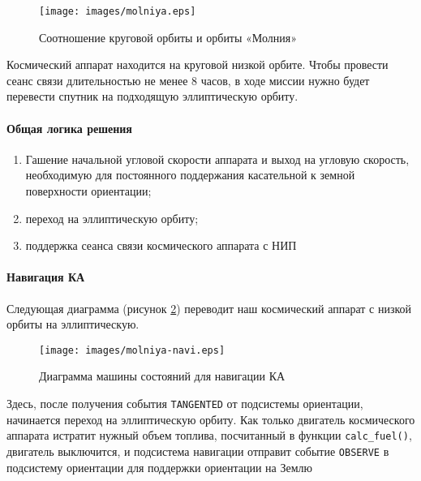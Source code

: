 \documentclass[12pt,a4paper]{article}
\begin{document}
\begin{figure}[tbh]
  \begin{center}
    \texttt{[image: images/molniya.eps]}
    \caption{Соотношение круговой орбиты и орбиты «Молния»}
    \label{Pic:Molniya}
  \end{center}
\end{figure}

Космический аппарат находится на круговой низкой орбите. Чтобы провести сеанс связи длительностью не менее 8 часов, в ходе миссии нужно будет перевести спутник на подходящую эллиптическую
орбиту.

\clearpage
\paragraph{Общая логика решения} 

\begin{enumerate}
\item Гашение начальной угловой скорости аппарата и выход на угловую скорость, необходимую для постоянного поддержания касательной к земной поверхности ориентации;
\item переход на эллиптическую орбиту;
\item поддержка сеанса связи космического аппарата с НИП
\end{enumerate}

\paragraph{Навигация КА} Следующая диаграмма (рисунок \ref{Pic:Molniya-navi}) переводит наш космический аппарат с низкой орбиты на эллиптическую.

\begin{figure}[tbh]
  \begin{center}
    \texttt{[image: images/molniya-navi.eps]}
    \caption{Диаграмма машины состояний для навигации КА}
    \label{Pic:Molniya-navi}
  \end{center}
\end{figure}

Здесь, после получения события \verb'TANGENTED' от подсистемы ориентации, начинается переход на эллиптическую орбиту. Как только двигатель космического аппарата истратит нужный объем топлива, посчитанный в функции \verb'calc_fuel()', двигатель выключится, и подсистема навигации отправит событие \verb'OBSERVE' в подсистему ориентации для поддержки ориентации на Землю

\clearpage
\end{document}

